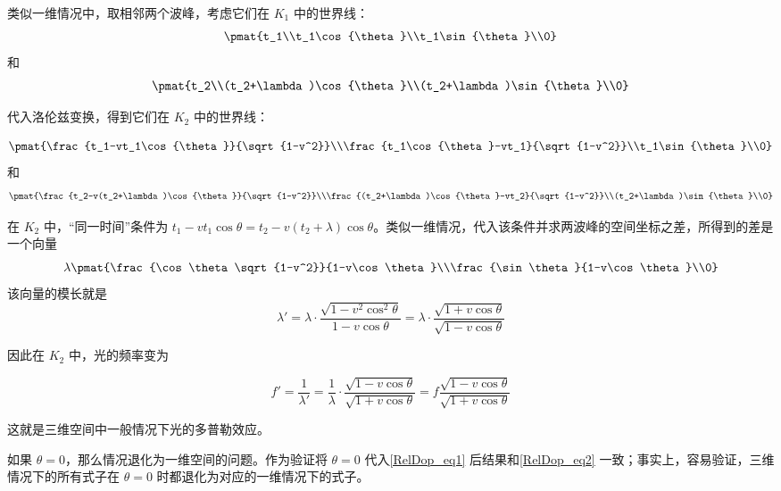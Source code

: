 类似一维情况中，取相邻两个波峰，考虑它们在 $K_1$ 中的世界线：
\begin{equation}
\pmat{t_1\\t_1\cos{\theta}\\t_1\sin{\theta}\\0}
\end{equation}
和
\begin{equation}
\pmat{t_2\\(t_2+\lambda)\cos{\theta}\\(t_2+\lambda)\sin{\theta}\\0}
\end{equation}

代入洛伦兹变换，得到它们在 $K_2$ 中的世界线：

\begin{equation}
\pmat{\frac{t_1-vt_1\cos{\theta}}{\sqrt{1-v^2}}\\\frac{t_1\cos{\theta}-vt_1}{\sqrt{1-v^2}}\\t_1\sin{\theta}\\0}
\end{equation}
和
\begin{equation}
\pmat{\frac{t_2-v(t_2+\lambda)\cos{\theta}}{\sqrt{1-v^2}}\\\frac{(t_2+\lambda)\cos{\theta}-vt_2}{\sqrt{1-v^2}}\\(t_2+\lambda)\sin{\theta}\\0}
\end{equation}

在 $K_2$ 中，“同一时间”条件为 $t_1-vt_1\cos{\theta}=t_2-v(t_2+\lambda)\cos{\theta}$。类似一维情况，代入该条件并求两波峰的空间坐标之差，所得到的差是一个向量
\begin{equation}
\lambda\pmat{\frac{\cos\theta\sqrt{1-v^2}}{1-v\cos\theta}\\\frac{\sin\theta}{1-v\cos\theta}\\0}
\end{equation}
该向量的模长就是
\begin{equation}
\lambda'=\lambda\cdot\frac{\sqrt{1-v^2\cos^2\theta}}{1-v\cos\theta} = \lambda\cdot\frac{\sqrt{1+v\cos\theta}}{\sqrt{1-v\cos\theta}}
\end{equation}

因此在 $K_2$ 中，光的频率变为

\begin{equation}\label{RelDop_eq1}
f'=\frac{1}{\lambda'}=\frac{1}{\lambda}\cdot\frac{\sqrt{1-v\cos\theta}}{\sqrt{1+v\cos\theta}}=f\frac{\sqrt{1-v\cos\theta}}{\sqrt{1+v\cos\theta}}
\end{equation}

这就是三维空间中一般情况下光的多普勒效应。

如果 $\theta=0$，那么情况退化为一维空间的问题。作为验证将 $\theta=0$ 代入\autoref{RelDop_eq1} 后结果和\autoref{RelDop_eq2} 一致；事实上，容易验证，三维情况下的所有式子在 $\theta=0$ 时都退化为对应的一维情况下的式子。
